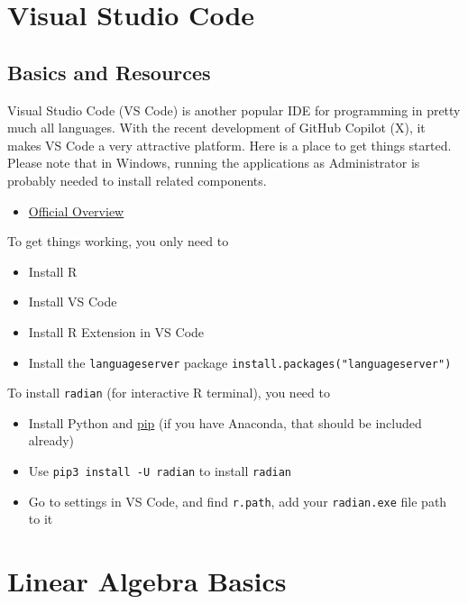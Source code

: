 \documentclass[
]{book}
\providecommand{\tightlist}{%
  \setlength{\itemsep}{0pt}\setlength{\parskip}{0pt}}
\theoremstyle{definition}
\theoremstyle{definition}
\theoremstyle{definition}
\theoremstyle{definition}
\theoremstyle{remark}
\begin{document}
\hypertarget{visual-studio-code}{%
\chapter{Visual Studio Code}\label{visual-studio-code}}

\hypertarget{basics-and-resources-1}{%
\section{Basics and Resources}\label{basics-and-resources-1}}

Visual Studio Code (VS Code) is another popular IDE for programming in pretty much all languages. With the recent development of GitHub Copilot (X), it makes VS Code a very attractive platform. Here is a place to get things started. Please note that in Windows, running the applications as Administrator is probably needed to install related components.

\begin{itemize}
\tightlist
\item
  \href{https://code.visualstudio.com/docs/languages/r}{Official Overview}
\end{itemize}

To get things working, you only need to

\begin{itemize}
\tightlist
\item
  Install R
\item
  Install VS Code
\item
  Install R Extension in VS Code
\item
  Install the \texttt{languageserver} package \texttt{install.packages("languageserver")}
\end{itemize}

To install \texttt{radian} (for interactive R terminal), you need to

\begin{itemize}
\tightlist
\item
  Install Python and \href{https://pip.pypa.io/en/stable/installation/}{pip} (if you have Anaconda, that should be included already)
\item
  Use \texttt{pip3\ install\ -U\ radian} to install \texttt{radian}
\item
  Go to settings in VS Code, and find \texttt{r.path}, add your \texttt{radian.exe} file path to it
\end{itemize}

\hypertarget{linear-algebra-basics}{%
\chapter{Linear Algebra Basics}\label{linear-algebra-basics}}
\end{document}
